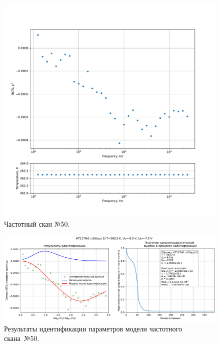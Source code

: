 \begin{figure}[!ht]
    \centering
    \includegraphics[width=1\textwidth]{../plots/КТ117№1_п1(база 2)_2500Гц-1Гц_1пФ_-10С_-6В-7В_20мВ_20мкс_шаг_0,1.pdf}
    \caption{Частотный скан №50.}
    \label{pic:frequency_scan_50}
\end{figure}

\begin{figure}[!ht]
    \centering
    \includegraphics[width=1\textwidth]{../plots/КТ117№1_п1(база 2)_2500Гц-1Гц_1пФ_-10С_-6В-7В_20мВ_20мкс_шаг_0,1_model.pdf}
    \caption{Результаты идентификации параметров модели частотного скана~№50.}
    \label{pic:frequency_scan_model50}
\end{figure}

\pagebreak


